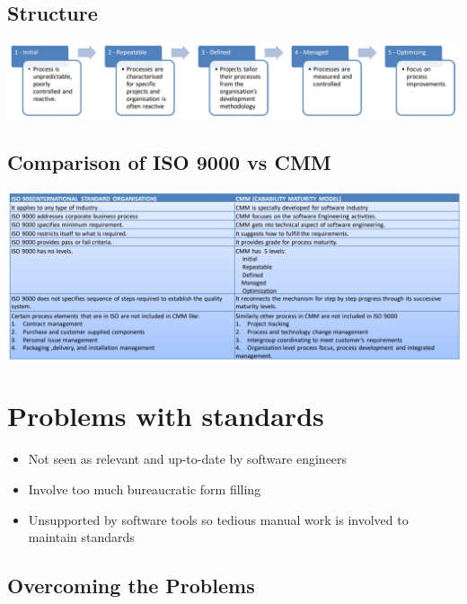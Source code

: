 \documentclass{article}
\begin{document}
\subsection{Structure}

\begin{center}
  \includegraphics[scale=0.5]{cmm_structur.png}
\end{center}

\pagebreak

\subsection{Comparison of ISO 9000 vs CMM}

\begin{center}
  \includegraphics[scale=0.5]{cmm_vs_iso.png}
\end{center}

\section{Problems with standards}
\begin{itemize}
  \item Not seen as relevant and up-to-date by software engineers
  \item Involve too much bureaucratic form filling
  \item Unsupported by software tools so tedious manual work is involved to maintain standards
\end{itemize}

\subsection{Overcoming the Problems}
\end{document}
